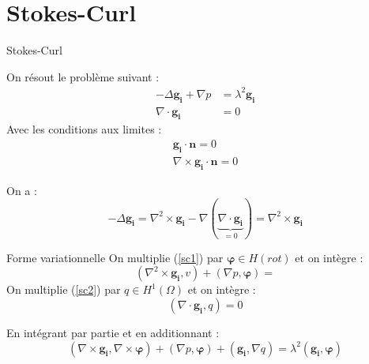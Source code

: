 \documentclass{beamer}
\newcommand{\grad}{{\nabla}}
\newcommand{\laplace}{{\Delta}}
\newcommand{\rot}{{\nabla\times}}
\newcommand{\rott}{{\nabla^2\times}}
\renewcommand{\div}{{\nabla\cdot}}
\begin{document}
\section{Stokes-Curl}
\begin{frame}{Stokes-Curl}
\begin{block}{On résout le problème suivant :}
\begin{align}
-\laplace \bm{g_i} +\grad p &= \lambda^2\bm{g_i}\label{sc1}\\
\div \bm{g_i} &= 0\label{sc2}
\end{align}
Avec les conditions aux limites :
\begin{align}
\bm{g_i}\cdot\bm{n}=0\\
\rot\bm{g_i}\cdot\bm{n}=0
\end{align}
\end{block}
On a :
\[
-\laplace\bm{g_i}=\rott\bm{g_i}-\grad(\underbrace{\div\bm{g_i}}_{=0})=\rott\bm{g_i}
\]
\end{frame}

\begin{frame}{Forme variationnelle}
On multiplie (\ref{sc1}) par $\bm{\varphi}\in H(rot)$ et on intègre :
\[
(\rott\bm{g_i},v)+(\grad p,\bm{\varphi}) = 
\]
On multiplie (\ref{sc2}) par $q\in H^1(\Omega)$ et on intègre :
\[
(\div\bm{g_i},q) = 0
\]
\begin{block}{En intégrant par partie et en additionnant :}
\[
(\rot\bm{g_i},\rot\bm{\varphi}) + (\grad p, \bm{\varphi}) + (\bm{g_i}, \grad q) = \lambda^2(\bm{g_i},\bm{\varphi})
\]
\end{block}
\end{frame}

\begin{frame}

\end{frame}
\end{document}
